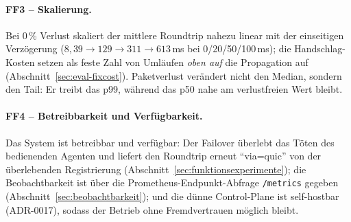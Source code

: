 \paragraph{FF3 -- Skalierung.} Bei 0\,\% Verlust skaliert der mittlere Roundtrip
nahezu linear mit der einseitigen Verzögerung
($8{,}39 \rightarrow 129 \rightarrow 311 \rightarrow 613$\,ms bei 0/20/50/100\,ms);
die Handschlag-Kosten setzen als feste Zahl von Umläufen \emph{oben auf} die
Propagation auf (Abschnitt~\ref{sec:eval-fixcost}). Paketverlust verändert nicht
den Median, sondern den Tail: Er treibt das p99, während das p50 nahe am
verlustfreien Wert bleibt.

\paragraph{FF4 -- Betreibbarkeit und Verfügbarkeit.} Das System ist betreibbar und
verfügbar: Der Failover überlebt das Töten des bedienenden Agenten und liefert den
Roundtrip erneut \enquote{via=quic} von der überlebenden Registrierung
(Abschnitt~\ref{sec:funktionsexperimente}); die Beobachtbarkeit ist über die
Prometheus-Endpunkt-Abfrage \texttt{/metrics} gegeben
(Abschnitt~\ref{sec:beobachtbarkeit}); und die dünne Control-Plane ist self-hostbar
(ADR-0017), sodass der Betrieb ohne Fremdvertrauen möglich bleibt.
